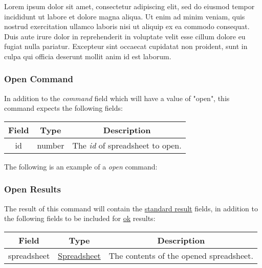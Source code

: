 Lorem ipsum dolor sit amet, consectetur adipiscing elit, sed do eiusmod tempor incididunt ut labore et dolore magna aliqua. Ut enim ad minim veniam, quis nostrud exercitation ullamco laboris nisi ut aliquip ex ea commodo consequat. Duis aute irure dolor in reprehenderit in voluptate velit esse cillum dolore eu fugiat nulla pariatur. Excepteur sint occaecat cupidatat non proident, sunt in culpa qui officia deserunt mollit anim id est laborum.

\subsubsection{Open Command}
In addition to the \emph{command} field which will have a value of "open", this command expects the following fields:
\begin{table}[H]
    \begin{center}
        \begin{tabular}{|c|c|c|}\hline
            Field & Type & Description \\\hline
            id & number & The \emph{id} of spreadsheet to open. \\\hline
        \end{tabular}
    \end{center}
\end{table}

The following is an example of a \emph{open} command:


\subsubsection{Open Results}
The result of this command will contain the \hyperref[sec:message:result]{standard result} fields, in addition to the following fields to be included for \underline{ok} results:
\begin{table}[H]
    \begin{center}
        \begin{tabular}{|c|c|c|}\hline
            Field & Type & Description \\\hline
            spreadsheet & \hyperref[sec:message:spreadsheet]{Spreadsheet} & The contents of the opened spreadsheet. \\\hline
        \end{tabular}
    \end{center}
\end{table}


